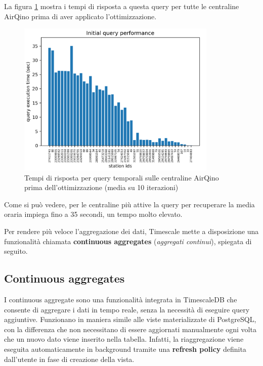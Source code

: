 La figura \ref{fig:query-prima} mostra i tempi di risposta a questa query per tutte le centraline AirQino prima di aver applicato l'ottimizzazione.

\begin{figure}[H]
\centering
\captionsetup{justification=centering}
\includegraphics[width=0.85\textwidth,height=\textheight,keepaspectratio]{img/query_prima}
\caption{Tempi di risposta per query temporali sulle centraline AirQino prima dell'ottimizzazione (media su 10 iterazioni)}
\label{fig:query-prima}
\end{figure}

Come si può vedere, per le centraline più attive la query per recuperare la media oraria impiega fino a 35 secondi, un tempo molto elevato.

Per rendere più veloce l'aggregazione dei dati, Timescale mette a disposizione una funzionalità chiamata \textbf{continuous aggregates} (\textit{aggregati continui}), spiegata di seguito.

\subsection{Continuous aggregates}\label{ssec:cont-aggr}
I continuous aggregate sono una funzionalità integrata in TimescaleDB che consente di aggregare i dati in tempo reale, senza la necessità di eseguire query aggiuntive. Funzionano in maniera simile alle viste materializzate di PostgreSQL, con la differenza che non necessitano di essere aggiornati manualmente ogni volta che un nuovo dato viene inserito nella tabella. Infatti, la riaggregazione viene eseguita automaticamente in background tramite una \textbf{refresh policy} definita dall'utente in fase di creazione della vista.

